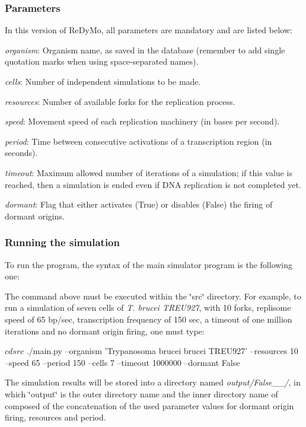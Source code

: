 \subsubsection*{Parameters}

In this version of Re\+Dy\+Mo, all parameters are mandatory and are listed below\+:
\begin{DoxyItemize}
\item {\itshape organism}\+: Organism name, as saved in the database (remember to add single quotation marks when using space-\/separated names).
\item {\itshape cells}\+: Number of independent simulations to be made.
\item {\itshape resources}\+: Number of available forks for the replication process.
\item {\itshape speed}\+: Movement speed of each replication machinery (in bases per second).
\item {\itshape period}\+: Time between consecutive activations of a transcription region (in seconds).
\item {\itshape timeout}\+: Maximum allowed number of iterations of a simulation; if this value is reached, then a simulation is ended even if D\+NA replication is not completed yet.
\item {\itshape dormant}\+: Flag that either activates (\textquotesingle{}True\textquotesingle{}) or disables (\textquotesingle{}False\textquotesingle{}) the firing of dormant origins.
\end{DoxyItemize}

\subsubsection*{Running the simulation}

To run the program, the syntax of the main simulator program is the following one\+: 


The command above must be executed within the \char`\"{}src\char`\"{} directory. For example, to run a simulation of seven cells of {\itshape T. brucei T\+R\+E\+U927}, with 10 forks, replisome speed of 65 bp/sec, transcription frequency of 150 sec, a timeout of one million iterations and no dormant origin firing, one must type\+: 
\begin{DoxyCode}
$ cd src
$ ./main.py --organism 'Trypanosoma brucei brucei TREU927' --resources 10 --speed 65 --period 150 --cells 7
       --timeout 1000000 --dormant False
\end{DoxyCode}
 The simulation results will be stored into a directory named {\itshape output/\+False\+\_\+\_/}, in which \char`\"{}output\char`\"{} is the outer directory name and the inner directory name of composed of the concatenation of the used parameter values for dormant origin firing, resources and period.


